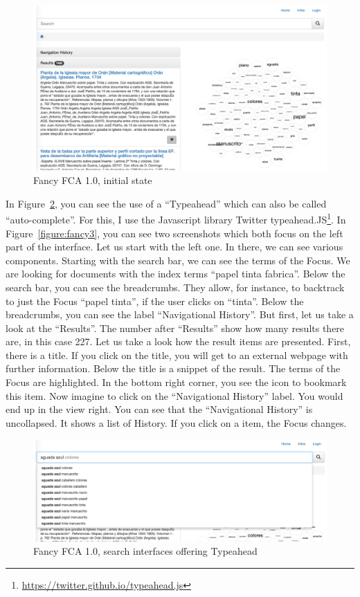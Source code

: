 \documentclass[11pt]{report}
\begin{document}
\begin{figure}[!ht]
	\centering
	\includegraphics[width=\linewidth]{images/fancy1}
\caption{Fancy FCA 1.0, initial state}
\label{figure:fancy1}
\end{figure}

 In Figure~\ref{figure:fancy2}, you can see the use of a ``Typeahead'' which can also be called ``auto-complete''. For this, I use the Javascript library Twitter typeahead.JS\footnote{\url{https://twitter.github.io/typeahead.js}}. In Figure~\ref{figure:fancy3}, you can see two screenshots which both focus on the left part of the interface. Let us start with the left one. In there, we can see various components. Starting with the search bar, we can see the terms of the Focus. We are looking for documents with the index terms ``papel tinta fabrica''. Below the search bar, you can see the breadcrumbs. They allow, for instance, to backtrack to just the Focus ``papel tinta'', if the user clicks on ``tinta''. Below the breadcrumbs, you can see the label ``Navigational History''. But first, let us take a look at the ``Results''. The number after ``Results'' show how many results there are, in this case 227. Let us take a look how the result items are presented. First, there is a title. If you click on the title, you will get to an external webpage with further information. Below the title is a snippet of the result. The terms of the Focus are highlighted. In the bottom right corner, you see the icon to bookmark this item. Now imagine to click on the ``Navigational History'' label. You would end up in the view right. You can see that the ``Navigational History'' is uncollapsed. It shows a list of History. If you click on a item, the Focus changes. \\
 
\begin{figure}[!ht]
	\centering
	\includegraphics[width=\linewidth]{images/fancy2}
\caption{Fancy FCA 1.0, search interfaces offering Typeahead}
\label{figure:fancy2}
\end{figure}
\end{document}
